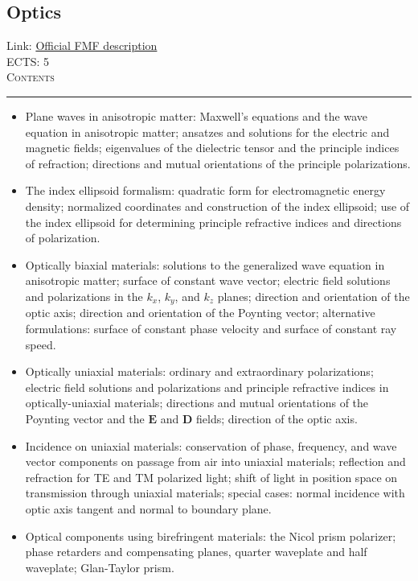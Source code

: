 \documentclass[11pt, a4paper]{article}
\renewcommand{\vec}{\bm}
\newenvironment{course}[3]{
\subsection{#1}%
Link: \href{#2}{Official FMF description}\\%
ECTS: #3%
\vspace{1ex}
\\
{\large \textsc{Contents}}\\[-0.9ex]%
\rule{\textwidth}{0.5pt}
\vspace{-3ex}
}
{}
\newenvironment{chapter}[1]{
\begin{tcolorbox}[title=#1, breakable]
}
{\end{tcolorbox}}
\begin{document}
\begin{course}{Optics}{https://www.fmf.uni-lj.si/en/study-physics/programmes/1fiz/2020/7000777/courses/1165/}{5}
\begin{chapter}{Optically anisotropic materials}
\begin{itemize}
            \item Plane waves in anisotropic matter: Maxwell's equations and the wave equation in anisotropic matter; ansatzes and solutions for the electric and magnetic fields; eigenvalues of the dielectric tensor and the principle indices of refraction; directions and mutual orientations of the principle polarizations.

            \item The index ellipsoid formalism: quadratic form for electromagnetic energy density; normalized coordinates and construction of the index ellipsoid; use of the index ellipsoid for determining principle refractive indices and directions of polarization.

            \item Optically biaxial materials: solutions to the generalized wave equation in anisotropic matter; surface of constant wave vector; electric field solutions and polarizations in the $ k_{x} $, $ k_{y} $, and $ k_{z} $ planes; direction and orientation of the optic axis; direction and orientation of the Poynting vector; alternative formulations: surface of constant phase velocity and surface of constant ray speed.

            \item Optically uniaxial materials: ordinary and extraordinary polarizations; electric field solutions and polarizations and principle refractive indices in optically-uniaxial materials; directions and mutual orientations of the Poynting vector and the $ \vec{E} $ and $ \vec{D} $ fields; direction of the optic axis.

            \item Incidence on uniaxial materials: conservation of phase, frequency, and wave vector components on passage from air into uniaxial materials; reflection and refraction for TE and TM polarized light; shift of light in position space on transmission through uniaxial materials; special cases: normal incidence with optic axis tangent and normal to boundary plane.

            \item Optical components using birefringent materials: the Nicol prism polarizer; phase retarders and compensating planes, quarter waveplate and half waveplate; Glan-Taylor prism.
        
        \end{itemize}
    \end{chapter}

    \begin{chapter}{Introduction to lasers}
        \begin{itemize}
        

\end{itemize}
\end{chapter}
\end{course}
\end{document}
